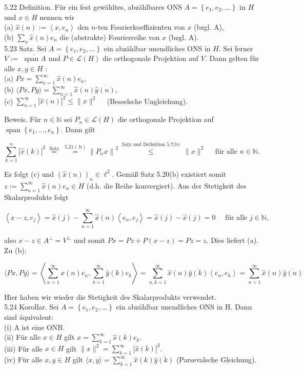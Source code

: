 \documentclass[10pt, letterpaper]{article}
\begin{document}
5.22 Definition. Für ein fest gewähltes, abzählbares ONS $A=\left\{e_{1}, e_{2}, \ldots\right\}$ in $H$ und $x \in H$ nennen wir\\
(a) $\hat{x}(n):=\left\langle x, e_{n}\right\rangle$ den $n$-ten Fourierkoeffizienten von $x$ (bzgl. A),\\
(b) $\sum_{n} \hat{x}(n) e_{n}$ die (abstrakte) Fourierreihe von $x$ (bzgl. A).\\
5.23 Satz. Sei $A=\left\{e_{1}, e_{2}, \ldots\right\}$ ein abzählbar unendliches ONS in $H$. Sei ferner $V:=$ $\overline{\operatorname{span} A}$ und $P \in \mathcal{L}(H)$ die orthogonale Projektion auf $V$. Dann gelten für alle $x, y \in H$ :\\
(a) $P x=\sum_{n=1}^{\infty} \hat{x}(n) e_{n}$,\\
(b) $\langle P x, P y\rangle=\sum_{n=1}^{\infty} \hat{x}(n) \overline{\hat{y}(n)}$,\\
(c) $\sum_{n=1}^{\infty}|\hat{x}(n)|^{2} \leq\|x\|^{2} \quad$ (Besselsche Ungleichung).

Beweis. Für $n \in \mathbb{N}$ sei $P_{n} \in \mathcal{L}(H)$ die orthogonale Projektion auf $\operatorname{span}\left\{e_{1}, \ldots, e_{n}\right\}$. Dann gilt

$$
\sum_{k=1}^{n}|\hat{x}(k)|^{2} \stackrel{\text { Satz }}{=} \stackrel{5.21(\mathrm{~b})}{=}\left\|P_{n} x\right\|^{2} \stackrel{\text { Satz und Definition 5.7(b) }}{\leq}\|x\|^{2} \quad \text { für alle } n \in \mathbb{N} \text {. }
$$

Es folgt (c) und $(\hat{x}(n))_{n} \in \ell^{2}$. Gemäß Satz 5.20(b) existiert somit $z:=\sum_{n=1}^{\infty} \hat{x}(n) e_{n} \in H$ (d.h. die Reihe konvergiert). Aus der Stetigkeit des Skalarprodukts folgt

$$
\left\langle x-z, e_{j}\right\rangle=\hat{x}(j)-\sum_{n=1}^{\infty} \hat{x}(n)\left\langle e_{n}, e_{j}\right\rangle=\hat{x}(j)-\hat{x}(j)=0 \quad \text { für alle } j \in \mathbb{N},
$$

also $x-z \in A^{\perp}=V^{\perp}$ und somit $P x=P z+P(x-z)=P z=z$. Dies liefert (a).\\
Zu (b):

$$
\langle P x, P y\rangle=\left\langle\sum_{n=1}^{\infty} \hat{x}(n) e_{n}, \sum_{k=1}^{\infty} \hat{y}(k) e_{k}\right\rangle=\sum_{n, k=1}^{\infty} \hat{x}(n) \overline{\hat{y}(k)}\left\langle e_{n}, e_{k}\right\rangle=\sum_{n=1}^{\infty} \hat{x}(n) \overline{\hat{y}(n)}
$$

Hier haben wir wieder die Stetigkeit des Skalarprodukts verwendet.\\
5.24 Korollar. Sei $A=\left\{e_{1}, e_{2}, \ldots\right\}$ ein abzählbar unendliches ONS in H. Dann sind äquivalent:\\
(i) A ist eine ONB.\\
(ii) Für alle $x \in H$ gilt $x=\sum_{k=1}^{\infty} \hat{x}(k) e_{k}$.\\
(iii) Für alle $x \in H$ gilt $\|x\|^{2}=\sum_{k=1}^{\infty}|\hat{x}(k)|^{2}$.\\
(iv) Für alle $x, y \in H$ gilt $\langle x, y\rangle=\sum_{k=1}^{\infty} \hat{x}(k) \overline{\hat{y}(k)}$ (Parsevalsche Gleichung).
\end{document}
